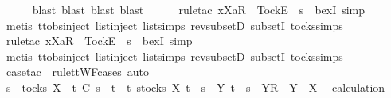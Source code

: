 \begin{isabellebody}
\ \ \ \ \isamarkupfalse%
\ {\isacharparenleft}blast{\isacharcomma}\ blast{\isacharcomma}\ blast{\isacharcomma}\ blast{\isacharparenright}\isanewline
\ \ \ \ \isamarkupfalse%
\ {\isacharparenleft}rule{\isacharunderscore}tac\ x{\isacharequal}{\isachardoublequoteopen}{\isacharbrackleft}Xa{\isacharbrackright}\isactrlsub R\ {\isacharhash}\ {\isacharbrackleft}Tock{\isacharbrackright}\isactrlsub E\ {\isacharhash}\ s{\isachardoublequoteclose}\ \ bexI{\isacharcomma}\ simp{\isacharparenright}\isanewline
\ \ \ \ \isamarkupfalse%
\ {\isacharparenleft}metis\ ttobs{\isachardot}inject{\isacharparenleft}{}{\isacharparenright}\ list{\isachardot}inject\ list{\isachardot}simps{\isacharparenleft}{}{\isacharparenright}\ rev{\isacharunderscore}subsetD\ subsetI\ tocks{\isachardot}simps{\isacharparenright}\isanewline
\ \ \ \ \isamarkupfalse%
\ {\isacharparenleft}rule{\isacharunderscore}tac\ x{\isacharequal}{\isachardoublequoteopen}{\isacharbrackleft}Xa{\isacharbrackright}\isactrlsub R\ {\isacharhash}\ {\isacharbrackleft}Tock{\isacharbrackright}\isactrlsub E\ {\isacharhash}\ s{\isachardoublequoteclose}\ \ bexI{\isacharcomma}\ simp{\isacharparenright}\isanewline
\ \ \ \ \isamarkupfalse%
\ {\isacharparenleft}metis\ ttobs{\isachardot}inject{\isacharparenleft}{}{\isacharparenright}\ list{\isachardot}inject\ list{\isachardot}simps{\isacharparenleft}{}{\isacharparenright}\ rev{\isacharunderscore}subsetD\ subsetI\ tocks{\isachardot}simps{\isacharparenright}\isanewline
\ \ \ \ \isamarkupfalse%
\ {\isacharparenleft}case{\isacharunderscore}tac\ {\isasymsigma}\ rule{\isacharcolon}ttWF{\isachardot}cases{\isacharcomma}\ auto{\isacharparenright}{\isacharplus}\isanewline
\ \ \ \ \isamarkupfalse%
\isanewline
\ \ \isamarkupfalse%
\ \isamarkupfalse%
\ {\isachardoublequoteopen}s\ {\isasymin}\ tocks\ X\ {\isasymLongrightarrow}\ t\ {\isasymlesssim}\isactrlsub C\ s\ {\isasymLongrightarrow}\ t\ {\isasymin}\ {\isacharbraceleft}t{\isachardot}\ {\isasymexists}s{\isasymin}tocks\ X{\isachardot}\ t\ {\isacharequal}\ s\ {\isasymor}\ {\isacharparenleft}{\isasymexists}Y{\isachardot}\ t\ {\isacharequal}\ s\ {\isacharat}\ {\isacharbrackleft}{\isacharbrackleft}Y{\isacharbrackright}\isactrlsub R{\isacharbrackright}\ {\isasymand}\ Y\ {\isasymsubseteq}\ X{\isacharparenright}{\isacharbraceright}{\isachardoublequoteclose}\ \isamarkupfalse%
\ calculation\ \isamarkupfalse%

\end{isabellebody}
